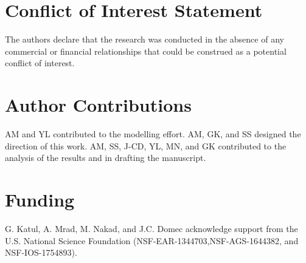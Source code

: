 \documentclass[utf8]{frontiersSCNS} %
\begin{document}




\section*{Conflict of Interest Statement}

The authors declare that the research was conducted in the absence of any commercial or financial relationships that could be construed as a potential conflict of interest.

\section*{Author Contributions}

AM and YL contributed to the modelling effort. AM, GK, and SS designed the direction of this work. AM, SS, J-CD, YL, MN, and GK contributed to the analysis of the results and in drafting the manuscript.

\section*{Funding}
G. Katul, A. Mrad, M. Nakad, and J.C. Domec acknowledge support from the U.S. National Science Foundation (NSF-EAR-1344703,NSF-AGS-1644382, and NSF-IOS-1754893).
\end{document}
